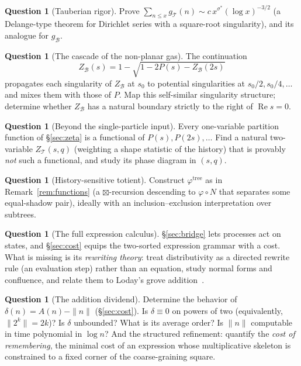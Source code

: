 \documentclass[11pt]{article}
\newcommand{\cT}{\mathcal{T}}   %
\newcommand{\cB}{\mathcal{B}}   %
\numberwithin{equation}{section}
\theoremstyle{plain}
\theoremstyle{definition}
\newtheorem{question}[theorem]{Question}
\theoremstyle{remark}
\begin{document}
\begin{question}[Tauberian rigor]\label{prob:tauberian}
Prove $\sum_{n \le x} g_\cT(n) \sim c\, x^{\sigma^{*}} (\log x)^{-3/2}$ (a
Delange-type theorem for Dirichlet series with a square-root singularity), and its
analogue for $g_\cB$.
\end{question}

\begin{question}[The cascade of the non-planar gas]\label{prob:cascade}
The continuation
\[
Z_\cB(s) = 1 - \sqrt{1 - 2P(s) - Z_\cB(2s)}
\]
propagates each singularity of $Z_\cB$ at $s_0$ to potential singularities at
$s_0/2, s_0/4, \dots$ and mixes them with those of $P$. Map this self-similar singularity structure;
determine whether $Z_\cB$ has a natural boundary strictly to the right of
$\operatorname{Re} s = 0$.
\end{question}

\begin{question}[Beyond the single-particle input]\label{prob:twovar}
Every one-variable partition function of \S\ref{sec:zeta} is a functional of
$P(s), P(2s), \dots$ Find a natural two-variable $Z_\cT(s,q)$ (weighting a shape
statistic of the history) that is provably \emph{not} such a functional, and study its
phase diagram in $(s,q)$.
\end{question}

\begin{question}[History-sensitive totient]\label{prob:totient}
Construct $\varphi^{\mathrm{tree}}$ as in Remark~\ref{rem:functions} (a $\boxtimes$-recursion
descending to $\varphi\circ N$ that separates some equal-shadow pair), ideally with an
inclusion--exclusion interpretation over subtrees.
\end{question}

\begin{question}[The full expression calculus]\label{prob:calculus}
\S\ref{sec:bridge} lets processes act on states, and \S\ref{sec:cost} equips the
two-sorted expression grammar with a cost. What is missing is its \emph{rewriting
theory}: treat distributivity as a directed rewrite rule (an evaluation step) rather
than an equation, study normal forms and confluence, and relate them to Loday's grove
addition~\cite{loday,brunoyasaki}.
\end{question}

\begin{question}[The addition dividend]\label{prob:cost}
Determine the behavior of $\delta(n) = A(n) - \|n\|$ (\S\ref{sec:cost}). Is
$\delta \equiv 0$ on powers of two (equivalently, $\|2^k\| = 2k$)? Is $\delta$
unbounded? What is its average order? Is $\|n\|$ computable in time polynomial in
$\log n$? And the structured refinement: quantify the \emph{cost of remembering},
the minimal cost of an expression whose multiplicative skeleton is constrained to a
fixed corner of the coarse-graining square.
\end{question}
\end{document}
